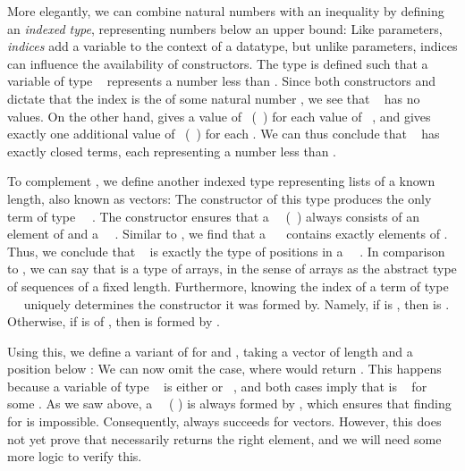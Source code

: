 More elegantly, we can combine natural numbers with an inequality by defining an \emph{indexed type}, representing numbers below an upper bound:
Like parameters, \emph{indices} add a variable to the context of a datatype, but unlike parameters, indices can influence the availability of constructors. The type  is defined such that a variable of type \  represents a number less than . Since both constructors  and  dictate that the index is the  of some natural number , we see that \  has no values. On the other hand,  gives a value of \ (\ ) for each value of \ , and  gives exactly one additional value of \ (\ ) for each . We can thus conclude that \  has exactly  closed terms, each representing a number less than .

To complement , we define another indexed type representing lists of a known length, also known as vectors:
The \AIC{[]} constructor of this type produces the only term of type \ \ . The  constructor ensures that a \ \ (\ ) always consists of an element of  and a \ \ . Similar to , we find that a \ \  contains exactly  elements of . Thus, we conclude that \  is exactly the type of positions in a \ \ . In comparison to , we can say that  is a type of arrays, in the sense of arrays as the abstract type of sequences of a fixed length. Furthermore, knowing the index of a term  of type \ \  uniquely determines the constructor it was formed by. Namely, if  is , then  is \AIC{[]}. Otherwise, if  is  of , then  is formed by . 

Using this, we define a variant of  for  and , taking a vector of length  and a position below :
We can now omit the \AIC{[]} case, where  would return . This happens because a variable of type \  is either  or \ , and both cases imply that  is \  for some . As we saw above, a \ \ ( ) is always formed by , which ensures that finding \AIC{[]} for  is impossible. Consequently,  always succeeds for vectors. However, this does not yet prove that  necessarily returns the right element, and we will need some more logic to verify this.

